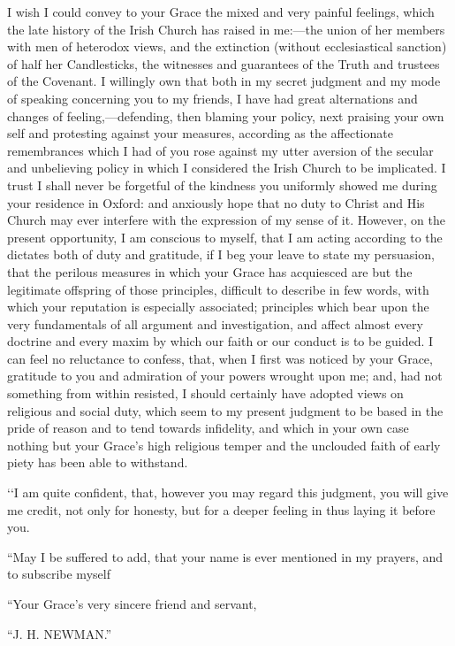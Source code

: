 I wish I could convey to your Grace the mixed and
very painful feelings, which the late history of the Irish Church has
raised in me:—the union of her members with men of heterodox views,
and the extinction (without ecclesiastical sanction) of half her
Candlesticks, the witnesses and guarantees of the Truth and trustees of
the Covenant. I willingly own that both in my secret judgment and my
mode of speaking concerning you to my friends, I have had great
alternations and changes of feeling,—defending, then blaming your
policy, next praising your own self and protesting against your
measures, according as the affectionate remembrances which I had of you
rose against my utter aversion of the secular and unbelieving policy in
which I considered the Irish Church to be implicated. I trust I shall
never be forgetful of the kindness you uniformly showed me during your
residence in Oxford: and anxiously hope that no duty to Christ and His
Church may ever interfere with the expression of my sense of it.
However, on the present opportunity, I am conscious to myself, that I am
acting according to the dictates both of duty and gratitude, if I beg
your leave to state my persuasion, that the perilous measures in which
your Grace has acquiesced are but the legitimate offspring of those
principles, difficult to describe in few words, with which your
reputation is especially associated; principles which bear upon the very
fundamentals of all argument and investigation, and affect almost every
doctrine and every maxim by which our faith or our conduct is to be
guided. I can feel no reluctance to confess, that, when I first was
noticed by your Grace, gratitude to you and admiration of your powers
wrought upon me; and, had not something from within resisted, I should
certainly have adopted views on religious and social duty, which seem to
my present judgment to be based in the pride of reason and to tend
towards infidelity, and which in your own case nothing but your Grace's
high religious temper and the unclouded faith of early piety has been
able to withstand.

‘‘I am quite confident, that, however you may
regard this judgment, you will give me credit, not only for honesty, but
for a deeper feeling in thus laying it before you.

``May I be suffered to add, that your name is
ever mentioned in my prayers, and to subscribe myself

``Your Grace's very sincere friend and servant,

``J. H. NEWMAN.''


